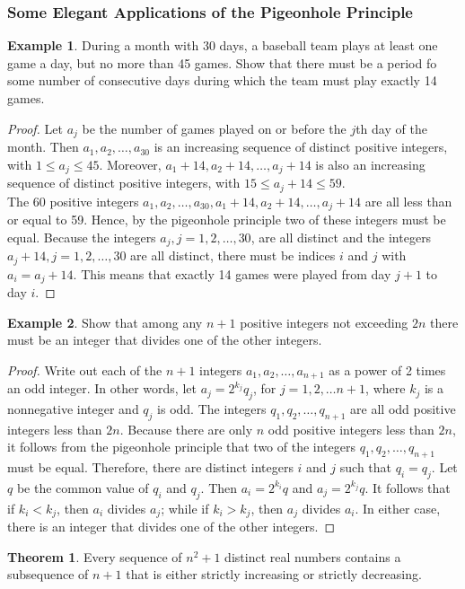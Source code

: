 \documentclass[article, 11pt]{article}
\theoremstyle{definition}
\newtheorem{example}{Example}[subsubsection]
\newtheorem{theorem}{Theorem}[subsubsection]
\begin{document}
    \subsubsection{Some Elegant Applications of the Pigeonhole Principle}
    \begin{example}
        During a month with 30 days, a baseball team plays at least one game a day, but no more than 45 games. Show that there must be a period fo some number of consecutive days during which the team must play exactly 14 games.
        \begin{proof}
            Let $a_j$ be the number of games played on or before the $j$th day of the month. Then $a_1, a_2, \dots, a_{30}$ is an increasing sequence of distinct positive integers, with $1 \leq a_j \leq 45$. Moreover, $a_1 + 14, a_2 + 14, \dots, a_j + 14$ is also an increasing sequence of distinct positive integers, with $15 \leq a_j + 14 \leq 59$. \\

            The 60 positive integers $a_1, a_2, \dots, a_{30}, a_1 + 14, a_2 + 14, \dots, a_j + 14$ are all less than or equal to 59. Hence, by the pigeonhole principle two of these integers must be equal. Because the integers $a_j, j = 1,2,\dots, 30$, are all distinct and the integers $a_j+14, j= 1,2,\dots,30$ are all distinct, there must be indices $i$ and $j$ with $a_i = a_j + 14$. This means that exactly 14 games were played from day $j+1$ to day $i$.
        \end{proof}
    \end{example}
    \begin{example}
        Show that among any $n+1$ positive integers not exceeding $2n$ there must be an integer that divides one of the other integers.
        \begin{proof}
            Write out each of the $n+1$ integers $a_1, a_2, \dots, a_{n+1}$ as a power of 2 times an odd integer. In other words, let $a_j=2^{k_j}q_j$, for $j=1,2,\dots n+1$, where $k_j$ is a nonnegative integer and $q_j$ is odd. The integers $q_1, q_2, \dots, q_{n+1}$ are all odd positive integers less than $2n$. Because there are only $n$ odd positive integers less than $2n$, it follows from the pigeonhole principle that two of the integers $q_1, q_2, \dots, q_{n+1}$ must be equal. Therefore, there are distinct integers $i$ and $j$ such that $q_i = q_j$. Let $q$ be the common value of $q_i$ and $q_j$. Then $a_i = 2^{k_i}q$ and $a_j = 2^{k_j}q$. It follows that if $k_i < k_j$, then $a_i$ divides $a_j$; while if $k_i > k_j$, then $a_j$ divides $a_i$. In either case, there is an integer that divides one of the other integers.
        \end{proof}
    \end{example}
    \begin{theorem}
        Every sequence of $n^2 + 1$ distinct real numbers contains a subsequence of $n+1$ that is either strictly increasing or strictly decreasing.
    \end{theorem}
\end{document}
